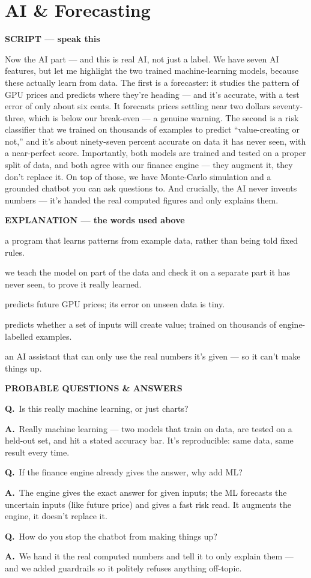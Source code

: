 \documentclass[12pt,a4paper]{article}
\newcommand{\block}[2]{\par\medskip\noindent\textcolor{#1}{\textbf{#2}}\par\nobreak\smallskip}
\newcommand{\SC}{\block{tvblue}{SCRIPT --- speak this}}
\newcommand{\EX}{\block{tvgreen}{EXPLANATION --- the words used above}}
\newcommand{\PQ}{\block{tvamber}{PROBABLE QUESTIONS \& ANSWERS}}
\newcommand{\qa}[2]{\par\noindent\textbf{Q.}~#1\par\noindent\textbf{A.}~#2\par\smallskip}
\newenvironment{terms}{\begin{description}[leftmargin=0pt,itemsep=2pt,font=\normalfont\bfseries]}{\end{description}}
\begin{document}
\section{AI \& Forecasting}

\SC
Now the AI part --- and this is real AI, not just a label. We have seven AI features, but let me
highlight the two trained machine-learning models, because these actually learn from data. The first
is a forecaster: it studies the pattern of GPU prices and predicts where they're heading --- and it's
accurate, with a test error of only about six cents. It forecasts prices settling near two dollars
seventy-three, which is below our break-even --- a genuine warning. The second is a risk classifier
that we trained on thousands of examples to predict ``value-creating or not,'' and it's about
ninety-seven percent accurate on data it has never seen, with a near-perfect score. Importantly, both
models are trained and tested on a proper split of data, and both agree with our finance engine ---
they augment it, they don't replace it. On top of those, we have Monte-Carlo simulation and a grounded
chatbot you can ask questions to. And crucially, the AI never invents numbers --- it's handed the real
computed figures and only explains them.

\EX
\begin{terms}
  \item[Machine-learning model:] a program that learns patterns from example data, rather than being
  told fixed rules.
  \item[Train/test split:] we teach the model on part of the data and check it on a separate part it
  has never seen, to prove it really learned.
  \item[Forecaster (test error \textasciitilde 6\%):] predicts future GPU prices; its error on unseen
  data is tiny.
  \item[Risk classifier (\textasciitilde 97\% accurate):] predicts whether a set of inputs will create
  value; trained on thousands of engine-labelled examples.
  \item[Grounded chatbot:] an AI assistant that can only use the real numbers it's given --- so it can't
  make things up.
\end{terms}

\PQ
\qa{Is this really machine learning, or just charts?}{Really machine learning --- two models that train
on data, are tested on a held-out set, and hit a stated accuracy bar. It's reproducible: same data,
same result every time.}
\qa{If the finance engine already gives the answer, why add ML?}{The engine gives the exact answer for
given inputs; the ML forecasts the uncertain inputs (like future price) and gives a fast risk read.
It augments the engine, it doesn't replace it.}
\qa{How do you stop the chatbot from making things up?}{We hand it the real computed numbers and tell
it to only explain them --- and we added guardrails so it politely refuses anything off-topic.}
\end{document}
